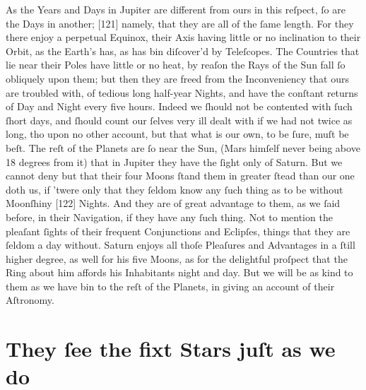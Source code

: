 \documentclass[letterpaper]{book}
\begin{document}
As the Years and Days in Jupiter are different from ours in this reſpect, ſo
are the Days in another; [121] namely, that they are all of the ſame length.
For they there enjoy a perpetual Equinox, their Axis having little or no
inclination to their Orbit, as the Earth's has, as has bin diſcover'd by
Teleſcopes. The Countries that lie near their Poles have little or no heat,
by reaſon the Rays of the Sun fall ſo obliquely upon them; but then they are
freed from the Inconveniency that ours are troubled with, of tedious long
half-year Nights, and have the conſtant returns of Day and Night every
five hours. Indeed we ſhould not be contented with ſuch ſhort days, and
ſhould count our ſelves very ill dealt with if we had not twice as long, tho
upon no other account, but that what is our own, to be ſure, muſt be beſt.
The reſt of the Planets are ſo near the Sun, (Mars himſelf never being above
18 degrees from it) that in Jupiter they have the ſight only of Saturn.  But
we cannot deny but that their four Moons ſtand them in greater ſtead than
our one doth us, if 'twere only that they ſeldom know any ſuch thing as to
be without Moonſhiny [122] Nights. And they are of great advantage to them,
as we ſaid before, in their Navigation, if they have any ſuch thing. Not to
mention the pleaſant ſights of their frequent Conjunctions and Eclipſes,
things that they are ſeldom a day without.  Saturn enjoys all thoſe
Pleaſures and Advantages in a ſtill higher degree, as well for his five
Moons, as for the delightful proſpect that the Ring about him affords his
Inhabitants night and day. But we will be as kind to them as we have bin to
the reſt of the Planets, in giving an account of their Aſtronomy.


\section{They ſee the fixt Stars juſt as we do}
\end{document}

